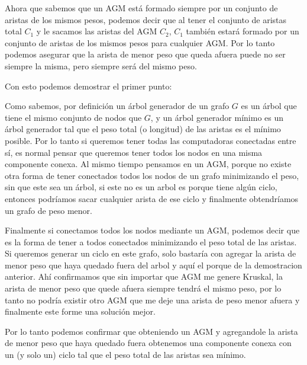 Ahora que sabemos que un AGM est\'a formado siempre por un conjunto de aristas de los mismos pesos, podemos decir que al tener el conjunto de aristas total $C_1$ y le sacamos las aristas del AGM $C_2$, $C_1$ tambi\'en estar\'a formado por un conjunto de aristas de los mismos pesos para cualquier AGM. Por lo tanto podemos asegurar que la arista de menor peso que queda afuera puede no ser siempre la misma, pero siempre ser\'a del mismo peso.

Con esto podemos demostrar el primer punto:

Como sabemos, por definici\'on un \'arbol generador de un grafo $G$ es un \'arbol que tiene el mismo conjunto de nodos que $G$, y un \'arbol generador mínimo es un \'arbol generador tal que el peso total (o longitud) de las aristas es el mínimo posible.
Por lo tanto si queremos tener todas las computadoras conectadas entre s\'i, es normal pensar que queremos tener todos los nodos en una misma componente conexa.
Al mismo tiempo pensamos en un AGM, porque no existe otra forma de tener conectados todos los nodos de un grafo minimizando el peso, sin que este sea un \'arbol, si este no es un arbol es porque tiene alg\'un ciclo, entonces podr\'iamos sacar cualquier arista de ese ciclo y finalmente obtendr\'iamos un grafo de peso menor.

Finalmente si conectamos todos los nodos mediante un AGM, podemos decir que es la forma de tener a todos conectados minimizando el peso total de las aristas. Si queremos generar un ciclo en este grafo, solo bastaría con agregar la arista de menor peso que haya quedado fuera del arbol y aquí el porque de la demostracion anterior. Ahí confirmamos que sin importar que AGM me genere Kruskal, la arista de menor peso que quede afuera siempre tendr\'a el mismo peso, por lo tanto no podr\'ia existir otro AGM que me deje una arista de peso menor afuera y finalmente este forme una soluci\'on mejor.

Por lo tanto podemos confirmar que obteniendo un AGM y agregandole la arista de menor peso que haya quedado fuera obtenemos una componente conexa con un (y solo un) ciclo tal que el peso total de las aristas sea m\'inimo.


\newpage


